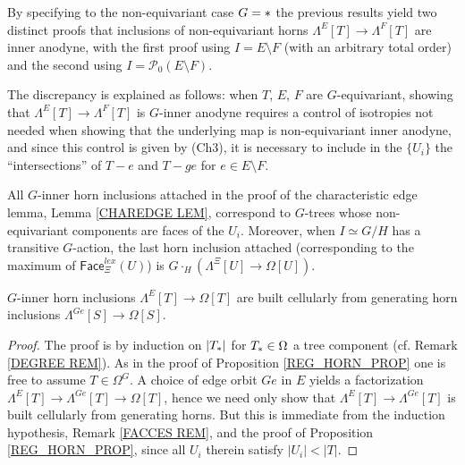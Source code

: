 \documentclass[a4paper,10pt
,draft
]{article}%
\begin{document}
\begin{remark}\label{TWOPROOF REM}
	By specifying to the non-equivariant case $G = \**$
	the previous results yield two distinct proofs
	that inclusions of non-equivariant horns
	$\Lambda^{E}[T] \to \Lambda^{F}[T]$
	are inner anodyne,
	with the first proof using $I = E \setminus F$ (with an arbitrary total order) and the second using 
	$I = \mathcal{P}_0(E \setminus F)$. 

	The discrepancy is explained as follows: 
	when $T$, $E$, $F$ are $G$-equivariant, showing that
	$\Lambda^{E}[T] \to \Lambda^{F}[T]$ 
	is $G$-inner anodyne requires a control of isotropies 
	not needed when showing that the underlying map is non-equivariant inner anodyne, and since this control is given by (Ch3), it is necessary to include in the $\{U_i\}$ the
	``intersections'' of $T-e$ and $T-ge$ for $e \in E \setminus F$. 
\end{remark}


\begin{remark}\label{FACCES REM}
All $G$-inner horn inclusions attached in the proof of the characteristic edge lemma, Lemma \ref{CHAREDGE LEM}, correspond to $G$-trees whose non-equivariant components are faces of the $U_i$. Moreover, when $I \simeq G/H$ has a transitive $G$-action, the last horn inclusion attached (corresponding to the maximum of $\mathsf{Face}^{lex}_{\Xi}(U)$) is
$G \cdot_H \left( \Lambda^{\Xi}[U] \to \Omega[U] \right)$.
\end{remark}


\begin{corollary}\label{REGGENHORN COR}
$G$-inner horn inclusions
$\Lambda^{E}[T] \to \Omega[T]$
are built cellularly from generating horn inclusions
$\Lambda^{Ge}[S] \to \Omega[S]$.
\end{corollary}

\begin{proof}
	The proof is by induction on $|T_{\**}|$ for $T_{\**}\in \Omega$ a tree component (cf. Remark \ref{DEGREE REM}). As in the proof of Proposition \ref{REG_HORN_PROP} one is free to assume $T \in \Omega^G$.	
	A choice of edge orbit $Ge$ in $E$ yields a factorization
	$\Lambda^{E}[T] \to \Lambda^{Ge}[T] \to \Omega[T]$,
	hence we need only show that 
	$\Lambda^{E}[T] \to \Lambda^{Ge}[T]$ is built cellularly from generating horns. 
	But this is immediate from the induction hypothesis,
	Remark \ref{FACCES REM}, and the proof of Proposition \ref{REG_HORN_PROP}, since all
	$U_{i}$ therein satisfy $|U_i|<|T|$.
\end{proof}
\end{document}
